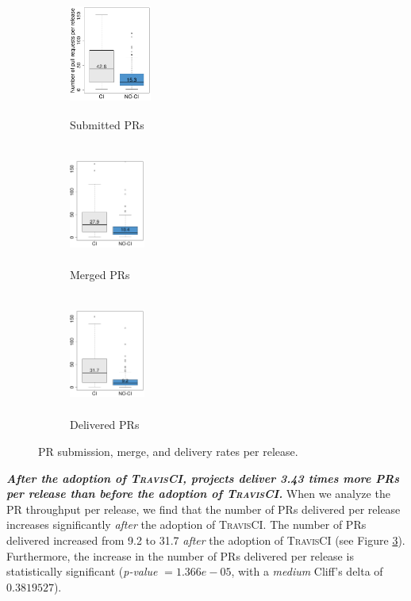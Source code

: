 \begin{figure}[!t]
	\centering
	\begin{subfigure}{3.0cm}
		\centering
		\includegraphics[width=2.7cm, height=4.0cm]{submitted_prs_per_release.pdf}
		\caption{Submitted PRs}
		\label{fig:submitted_prs_per_release}
	\end{subfigure}%
	\begin{subfigure}{2.8cm}
		\centering
		\includegraphics[width=2.5cm, height=4.0cm]{merged_prs_per_release.pdf}  
		\caption{Merged PRs}
		\label{fig:merged_prs_per_release}
	\end{subfigure}
	\begin{subfigure}{2.8cm}
		\centering
		\includegraphics[width=2.5cm, height=4.0cm]{released_prs_per_release.pdf}
		\caption{Delivered PRs}
		\label{fig:released_prs_per_release}
	\end{subfigure}
	\caption{PR submission, merge, and delivery rates per release.}
	\label{fig:pr_workflow}
\end{figure}

\textit{\textbf{After the adoption of \textsc{TravisCI}, projects deliver 3.43 times more PRs per
release than before the adoption of \textsc{TravisCI}.}} When we analyze the PR throughput per release, we find
that the number of PRs delivered per release increases significantly
\textit{after} the adoption of \textsc{TravisCI}. The number of PRs delivered increased from 9.2
to 31.7 \textit{after} the adoption of \textsc{TravisCI} (see Figure \ref{fig:released_prs_per_release}).
Furthermore, the increase in the number of PRs delivered per release 
is statistically significant (\textit{p-value} $= 1.366e-05$, with a {\em medium}
Cliff's delta of $0.3819527$).

